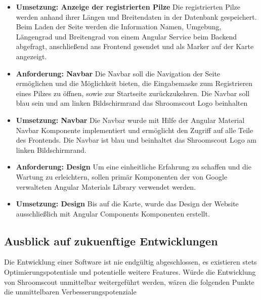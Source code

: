 \documentclass[../main.tex]{subfiles}
\begin{document}
\begin{itemize}
	\item \textbf{Umsetzung: Anzeige der registrierten Pilze}
		  Die registrierten Pilze werden anhand ihrer Längen und Breitendaten in der Datenbank gespeichert.
          Beim Laden der Seite werden die Information Namen, Umgebung, Längengrad und Breitengrad von einem Angular Service beim Backend abgefragt, anschließend ans Frontend gesendet
          und als Marker auf der Karte angezeigt.

	\item \textbf{Anforderung: Navbar}
	      Die Navbar soll die Navigation der Seite ermöglichen und die Möglichkeit bieten, die Eingabemaske zum Registrieren eines Pilzes zu öffnen, sowie zur Startseite zurückzukehren.
		  Die Navbar soll blau sein und am linken Bildschirmrand das Shroomscout Logo beinhalten
    \item \textbf{Umsetzung: Navbar}
	      Die Navbar wurde mit Hilfe der Angular Material Navbar Komponente implementiert und ermöglicht den Zugriff auf alle Teile des Frontends.
          Die Navbar ist blau und beinhaltet das Shroomscout Logo am linken Bildschirmrand.
	\item \textbf{Anforderung: Design}
	      Um eine einheitliche Erfahrung zu schaffen und die Wartung zu erleichtern, sollen primär Komponenten der von Google verwalteten Angular Materials Library verwendet werden.
    \item \textbf{Umsetzung: Design}
          Bis auf die Karte, wurde das Design der Website ausschließlich mit Angular Components Komponenten erstellt.
\end{itemize}

\subsubsection{}

\subsection{Ausblick auf zukuenftige Entwicklungen}
Die Entwicklung einer Software ist nie endgültig abgeschlossen, es existieren stets Optimierungspotentiale und potentielle weitere Features.
Würde die Entwicklung von Shroomscout unmittelbar weitergeführt werden, wären die folgenden Punkte die unmittelbaren Verbesserungspotenziale
\end{document}
